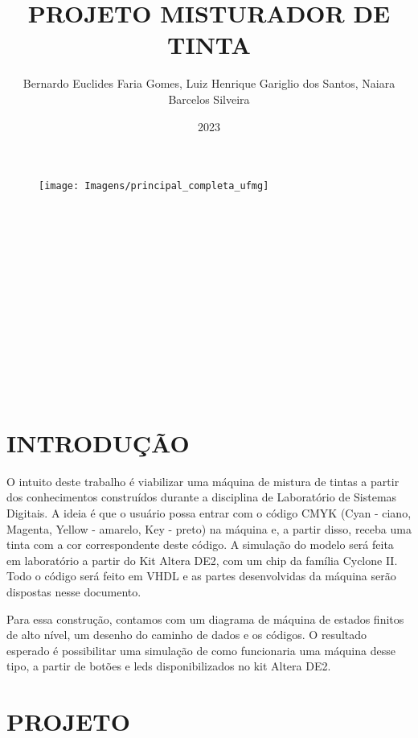 \documentclass[12pt,a4paper,oneside]{abntex2}
\author{Bernardo Euclides Faria Gomes, Luiz Henrique Gariglio dos Santos, Naiara Barcelos Silveira}
\title{PROJETO MISTURADOR DE TINTA}
\date{2023}
\renewcommand{\imprimircapa}{
	\begin{capa}
		\begin{center}
            \begin{figure}[h]
				\centering
				\texttt{[image: Imagens/principal\_completa\_ufmg]}
				\label{fig:principalcompletaufmg}
			\end{figure}
            \vspace{4cm}
    		{\normalsize\imprimirautor}\\[4cm]
    		{\normalsize\textbf{\imprimirtitulo}}\\
    		\vfill
    		{\normalsize\imprimirlocal}\\
    		{\normalsize\imprimirdata}
        \end{center}		
	\end{capa}
}
\newcommand{\folhaderostonova}{
	\begin{center}
        {\normalsize \imprimirautor } \\[5cm]
    	{\normalsize \textbf{\imprimirtitulo}} \\[4.5cm]
    	\hspace{.45 \textwidth} %
    	\begin{minipage}{.5\textwidth}
    		\imprimirpreambulo \\ \\
    	  \imprimirorientador \\ \\
    	\end{minipage}
    	\center
    	\vfill
    	{\normalsize \imprimirlocal } \\
    	{\normalsize \imprimirdata}
    \end{center}
}
\begin{document}
	\imprimircapa
	\folhaderostonova
	\newpage
	\listoffigures*
	\newpage
	\listoftables*
	\tableofcontents* \thispagestyle{empty} %
	\mainmatter %
	
	\chapter{INTRODUÇÃO}
        O intuito deste trabalho é viabilizar uma máquina de mistura de tintas a partir dos conhecimentos construídos durante a disciplina de Laboratório de Sistemas Digitais. A ideia é que o usuário possa entrar com o código CMYK (Cyan - ciano, Magenta, Yellow - amarelo, Key - preto) na máquina e, a partir disso, receba uma tinta com a cor correspondente deste código. A simulação do modelo será feita em laboratório a partir do Kit Altera DE2, com um chip da família Cyclone II. Todo o código será feito em VHDL e as partes desenvolvidas da máquina serão dispostas nesse documento. \par
        Para essa construção, contamos com um diagrama de máquina de estados finitos de alto nível, um desenho do caminho de dados e os códigos. O resultado esperado é possibilitar uma simulação de como funcionaria uma máquina desse tipo, a partir de botões e leds disponibilizados no kit Altera DE2.
        
	\chapter{PROJETO}
\end{document}
